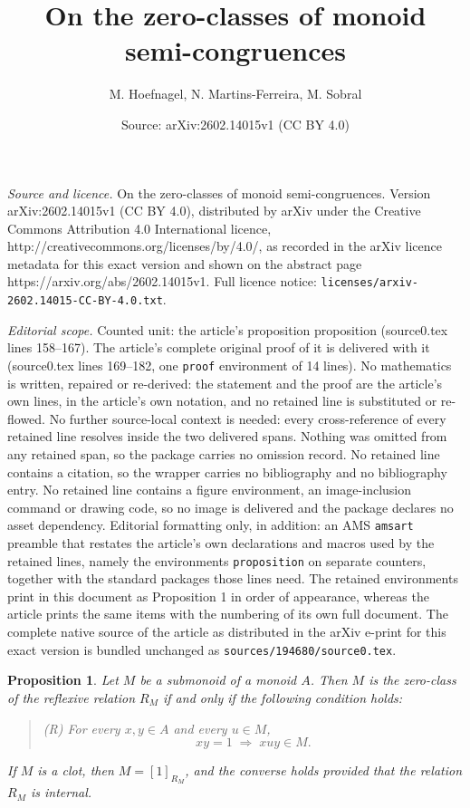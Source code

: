 \documentclass[10pt,a4paper]{amsart}
\title{On the zero-classes of monoid semi-congruences}
\author{M. Hoefnagel, N. Martins-Ferreira, M. Sobral}
\date{Source: arXiv:2602.14015v1 (CC BY 4.0)}
\newtheorem{proposition}{Proposition}
\begin{document}
\maketitle

\noindent\emph{Source and licence.} On the zero-classes of monoid semi-congruences. Version arXiv:2602.14015v1 (CC BY 4.0), distributed by arXiv under the Creative Commons Attribution 4.0 International licence, http://creativecommons.org/licenses/by/4.0/, as recorded in the arXiv licence metadata for this exact version and shown on the abstract page https://arxiv.org/abs/2602.14015v1. Full licence notice: \texttt{licenses/arxiv-2602.14015-CC-BY-4.0.txt}.\par\smallskip

\noindent\textit{Editorial scope.} Counted unit: the article's proposition proposition (source0.tex lines 158--167). The article's complete original proof of it is delivered with it (source0.tex lines 169--182, one \texttt{proof} environment of 14 lines). No mathematics is written, repaired or re-derived: the statement and the proof are the article's own lines, in the article's own notation, and no retained line is substituted or re-flowed.  No further source-local context is needed: every cross-reference of every retained line resolves inside the two delivered spans.  Nothing was omitted from any retained span, so the package carries no omission record.  No retained line contains a citation, so the wrapper carries no bibliography and no bibliography entry.  No retained line contains a figure environment, an image-inclusion command or drawing code, so no image is delivered and the package declares no asset dependency.  Editorial formatting only, in addition: an AMS \texttt{amsart} preamble that restates the article's own declarations and macros used by the retained lines, namely the environments \texttt{proposition} on separate counters, together with the standard packages those lines need.  The retained environments print in this document as Proposition 1 in order of appearance, whereas the article prints the same items with the numbering of its own full document.  The complete native source of the article as distributed in the arXiv e-print for this exact version is bundled unchanged as \texttt{sources/194680/source0.tex}.
\begin{proposition}
 Let $M$ be a submonoid of a monoid $A$. Then $M$ is the zero-class of the reflexive relation $R_M$ if and only if the following condition holds:
\begin{quote}
(R) For every $x,y\in A$ and every $u\in M$,
\[
xy = 1 \;\Rightarrow\; xuy \in M.
\]
\end{quote}
If $M$ is a clot, then $M = [1]_{R_M}$, and the converse holds provided that the relation $R_M$ is internal.
\end{proposition}
\end{document}
